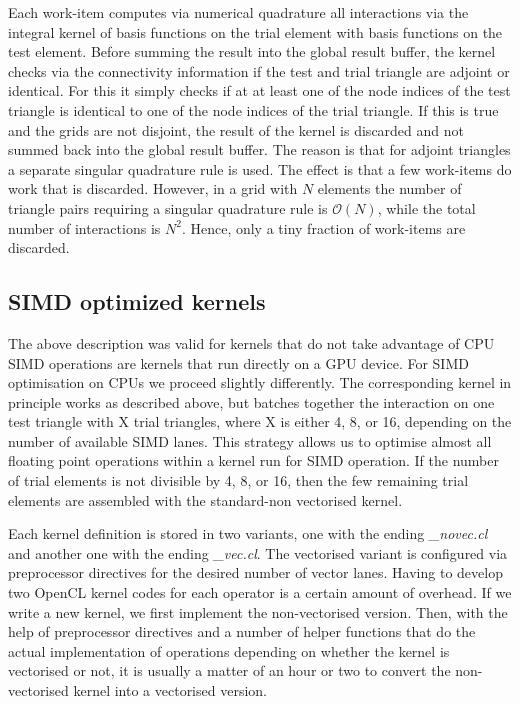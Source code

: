 Each work-item computes via numerical quadrature all interactions via the integral kernel of basis functions on the trial element with basis functions on the test element. Before summing the result into the global result buffer, the kernel checks via the connectivity information if the test and trial triangle are adjoint or identical. For this it simply checks if at at least one of the node indices of the test triangle is identical to one of the node indices of the trial triangle. If this is true and the grids are not disjoint, the result of the kernel is discarded and not summed back into the global result buffer. The reason is that for adjoint triangles a separate singular quadrature rule is used. The effect is that a few work-items do work that is discarded. However, in a grid with $N$ elements the number of triangle pairs requiring a singular quadrature rule is $\mathcal{O}(N)$, while the total number of interactions is $N^2$. Hence, only a tiny fraction of work-items are discarded.

\subsection{SIMD optimized kernels}

The above description was valid for kernels that do not take advantage of CPU SIMD operations are kernels that run directly on a GPU device. For SIMD optimisation on CPUs we proceed slightly differently. The corresponding kernel in principle works as described above, but batches together the interaction on one test triangle with X trial triangles, where X is either 4, 8, or 16, depending on the number of available SIMD lanes. This strategy allows us to optimise almost all floating point operations within a kernel run for SIMD operation. If the number of trial elements is not divisible by 4, 8, or 16, then the few remaining trial elements are assembled with the standard-non vectorised kernel.

Each kernel definition is stored in two variants, one with the ending \textit{\_novec.cl} and another one with the ending \textit{\_vec.cl}. The vectorised variant is configured via preprocessor directives for the desired number of vector lanes. Having to develop two OpenCL kernel codes for each operator is a certain amount of overhead. If we write a new kernel, we first implement the non-vectorised version. Then, with the help of preprocessor directives and a number of helper functions that do the actual implementation of operations depending on whether the kernel is vectorised or not, it is usually a matter of an hour or two to convert the non-vectorised kernel into a vectorised version.

